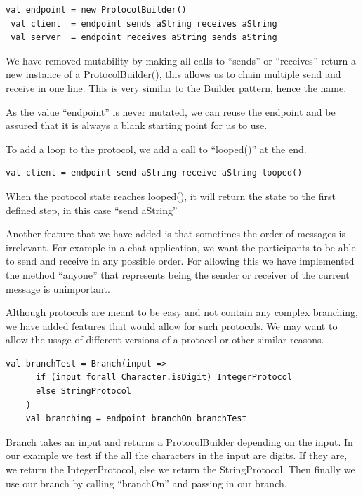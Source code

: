 \begin{lstlisting}[style=myScalastyle]
 val endpoint = new ProtocolBuilder()
 val client  = endpoint sends aString receives aString
 val server  = endpoint receives aString sends aString
\end{lstlisting}
We have removed mutability by making all calls to ``sends'' or ``receives'' return a new instance of a ProtocolBuilder(), this allows us to chain multiple send and receive in one line. This is very similar to the Builder pattern, hence the name.

As the value ``endpoint'' is never mutated, we can reuse the endpoint and be assured that it is always a blank starting point for us to use. 

To add a loop to the protocol, we add a call to ``looped()'' at the end.
\begin{lstlisting}[style=myScalastyle]
 val client = endpoint send aString receive aString looped()
\end{lstlisting}
When the protocol state reaches looped(), it will return the state to the first defined step, in this case ``send aString'' 

Another feature that we have added is that sometimes the order of messages is irrelevant. For example in a chat application, we want the participants to be able to send and receive in any possible order. For allowing this we have implemented the method ``anyone'' that represents being the sender or receiver of the current message is unimportant.

Although protocols are meant to be easy and not contain any complex branching, we have added features that would allow for such protocols. We may want to allow the usage of different versions of a protocol or other similar reasons.
\begin{lstlisting}[style=myScalastyle]
    val branchTest = Branch(input =>
      if (input forall Character.isDigit) IntegerProtocol
      else StringProtocol
    )
    val branching = endpoint branchOn branchTest
\end{lstlisting}
Branch takes an input and returns a ProtocolBuilder depending on the input. In our example we test if the all the characters in the input are digits. If they are, we return the IntegerProtocol, else we return the StringProtocol. Then finally we use our branch by calling ``branchOn'' and passing in our branch. 

